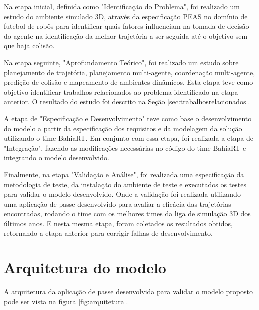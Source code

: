 Na etapa inicial, definida como "Identificação do Problema", foi realizado um estudo do ambiente simulado 3D, através da 
especificação PEAS\cite{brussel} no domínio de futebol de robôs para identificar quais fatores influenciam na 
tomada de decisão do agente na identificação da melhor trajetória a ser seguida até o objetivo sem que haja colisão.

Na etapa seguinte, "Aprofundamento Teórico", foi realizado um estudo sobre planejamento de trajetória, planejamento multi-agente, 
coordenação multi-agente, predição de colisão e mapeamento de ambientes dinâmicos. Esta etapa teve como objetivo identificar 
trabalhos relacionados ao problema identificado na etapa anterior. O resultado do estudo foi descrito na Seção \ref{sec:trabalhosrelacionados}.

A etapa de "Especificação e Desenvolvimento" teve como base o desenvolvimento do modelo a partir da especificação dos requisitos e da 
modelagem da solução utilizando o time BahiaRT. Em conjunto com essa etapa, foi realizada a etapa de "Integração", fazendo as modificações 
necessárias no código do time BahiaRT e integrando o modelo desenvolvido.

Finalmente, na etapa "Validação e Análise", foi realizada uma especificação da metodologia de teste, da instalação do ambiente de teste e 
executados os testes para validar o modelo desenvolvido. Onde a validação foi realizada utilizando uma aplicação de passe 
desenvolvido para avaliar a eficácia das trajetórias encontradas, rodando o time com os melhores times da liga de simulação 3D dos últimos anos. E 
nesta mesma etapa, foram coletados os resultados obtidos, retornando a etapa anterior para corrigir falhas de desenvolvimento.

\section{Arquitetura do modelo}
\label{sec:arquitetura}
A arquitetura da aplicação de passe desenvolvida para validar o modelo proposto pode ser vista na figura \ref{fig:arquitetura}.

